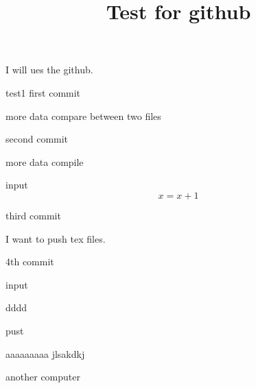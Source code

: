 \documentclass[draft]{amsart}
\title{Test for github}
\theoremstyle{remark}
\begin{document}
\maketitle
I will ues the github.

test1
first commit

more data
compare between two files

second commit

more data
compile

input
\begin{equation*}
    x= x+1
\end{equation*}



third commit

I want to push tex files.


4th commit

input


dddd


pust

aaaaaaaaa
jlsakdkj

another computer
\end{document}
